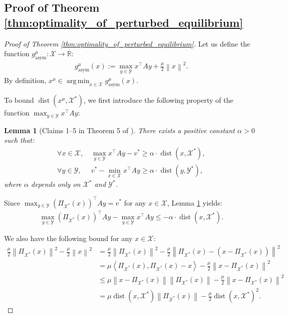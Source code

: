 \documentclass{article}
\DeclareMathOperator*{\argmin}{arg\,min}
\DeclareMathOperator{\dist}{dist}
\newcommand{\R}{\mathbb{R}}
\newcommand{\X}{\mathcal{X}}
\newcommand{\Y}{\mathcal{Y}}
\theoremstyle{plain}
\newtheorem{lemma}[theorem]{Lemma}
\begin{document}
\subsection{Proof of Theorem \ref{thm:optimality_of_perturbed_equilibrium}}
\begin{proof}[Proof of Theorem \ref{thm:optimality_of_perturbed_equilibrium}]
    Let us define the function $g_{\mathrm{asym}}^{\mu}: \X \to \R$:
    \begin{align*}
        g_{\mathrm{asym}}^{\mu}(x) := \max_{y\in \Y}x^{\top}Ay + \frac{\mu}{2}\left\|x\right\|^2.
    \end{align*}
    By definition, $x^{\mu}\in \argmin_{x\in \X} g_{\mathrm{asym}}^{\mu}(x)$.

    To bound $\dist(x^{\mu}, \X^{\ast})$, we first introduce the following property of the function $\max_{y\in \Y} x^{\top}Ay$:
    \begin{lemma}[Claims 1--5 in Theorem 5 of \cite{wei2020linear}]
        \label{lem:metric_subregularity}
        There exists a positive constant $\alpha > 0$ such that:
        \begin{align*}
            \forall x\in \X, ~ & \max_{y\in \Y} x^{\top}Ay - v^{\ast} \geq \alpha \cdot \dist(x, \X^{\ast}), \\
            \forall y\in \Y, ~ & v^{\ast} - \min_{x\in \X} x^{\top}Ay \geq \alpha \cdot \dist(y, \Y^{\ast}),
        \end{align*}
        where $\alpha$ depends only on $\X^{\ast}$ and $\Y^{\ast}$.
    \end{lemma}
    Since $\max_{y\in \Y}\left(\Pi_{\X^{\ast}}(x)\right)^{\top}Ay = v^{\ast}$ for any $x\in \X$, Lemma \ref{lem:metric_subregularity} yields:
    \begin{align}
        \max_{y\in \Y}\left(\Pi_{\X^{\ast}}(x)\right)^{\top}Ay - \max_{y\in \Y}x^{\top}Ay \leq -\alpha \cdot \dist(x, \X^{\ast}).
        \label{eq:linear_growth_inequality}
    \end{align}

    We also have the following bound for any $x\in \X$:
    \begin{align}
        \frac{\mu}{2}\left\|\Pi_{\X^{\ast}}(x)\right\|^2 - \frac{\mu}{2}\left\|x\right\|^2
        & = \frac{\mu}{2}\left\|\Pi_{\X^{\ast}}(x)\right\|^2 - \frac{\mu}{2}\left\|\Pi_{\X^{\ast}}(x) - \left(x - \Pi_{\X^{\ast}}(x)\right)\right\|^2 \nonumber \\
        & = \mu \left\langle \Pi_{\X^{\ast}}(x), \Pi_{\X^{\ast}}(x) - x \right\rangle - \frac{\mu}{2}\left\|x - \Pi_{\X^{\ast}}(x)\right\|^2 \nonumber          \\
        & \leq \mu \left\|x - \Pi_{\X^{\ast}}(x)\right\| \left\|\Pi_{\X^{\ast}}(x)\right\| - \frac{\mu}{2}\left\|x - \Pi_{\X^{\ast}}(x)\right\|^2 \nonumber \\
        & = \mu \dist(x, \X^{\ast}) \left\|\Pi_{\X^{\ast}}(x)\right\| - \frac{\mu}{2}\dist(x, \X^{\ast})^2.
        \label{eq:quadratic_difference_bound}
    \end{align}


\end{proof}
\end{document}
